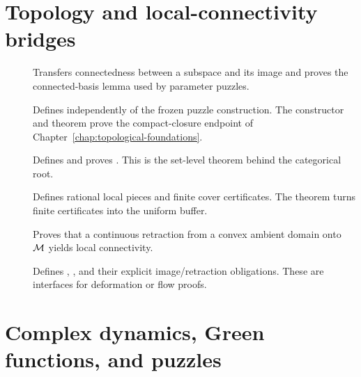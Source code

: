 \section{Topology and local-connectivity bridges}

\begin{description}
\item[]
Transfers connectedness between a subspace and its image and proves the
connected-basis lemma used by parameter puzzles.

\item[]
Defines  independently of the frozen
puzzle construction.  The constructor
 and theorem
 prove the
compact-closure endpoint of Chapter~\ref{chap:topological-foundations}.

\item[]
Defines  and proves
.
This is the set-level theorem behind the categorical root.

\item[]
Defines rational local pieces and finite cover certificates.  The theorem
turns finite certificates into the uniform buffer.

\item[]
Proves that a continuous retraction from a convex ambient domain onto
$\mathcal M$ yields local connectivity.

\item[]
Defines ,
, and their explicit image/retraction
obligations.  These are interfaces for deformation or flow proofs.
\end{description}

\section{Complex dynamics, Green functions, and puzzles}

